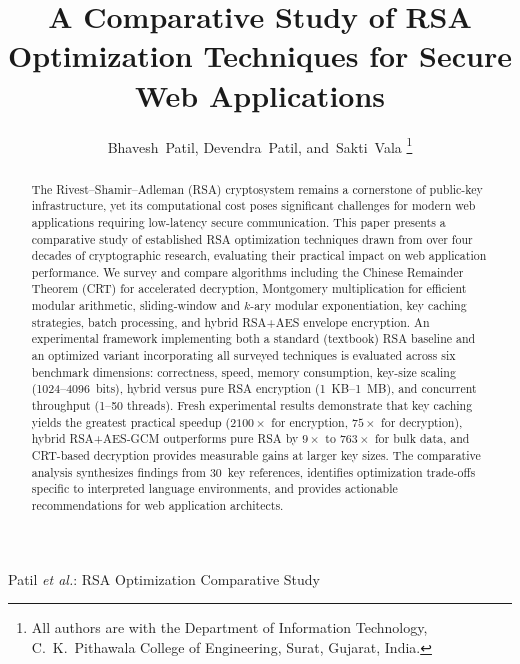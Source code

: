 \documentclass[journal]{IEEEtran}
\begin{document}
\title{A Comparative Study of RSA Optimization Techniques for Secure Web Applications}

\author{
Bhavesh~Patil,
Devendra~Patil,
and~Sakti~Vala%
\thanks{All authors are with the Department of Information Technology,
C.~K.~Pithawala College of Engineering, Surat, Gujarat, India.}%
}

%
{Patil \MakeLowercase{\textit{et al.}}: RSA Optimization Comparative Study}


\maketitle

\begin{abstract}
The Rivest--Shamir--Adleman (RSA) cryptosystem remains a cornerstone of public-key infrastructure, yet its computational cost poses significant challenges for modern web applications requiring low-latency secure communication. This paper presents a comparative study of established RSA optimization techniques drawn from over four decades of cryptographic research, evaluating their practical impact on web application performance. We survey and compare algorithms including the Chinese Remainder Theorem (CRT) for accelerated decryption, Montgomery multiplication for efficient modular arithmetic, sliding-window and $k$-ary modular exponentiation, key caching strategies, batch processing, and hybrid RSA+AES envelope encryption. An experimental framework implementing both a standard (textbook) RSA baseline and an optimized variant incorporating all surveyed techniques is evaluated across six benchmark dimensions: correctness, speed, memory consumption, key-size scaling (1024--4096~bits), hybrid versus pure RSA encryption (1~KB--1~MB), and concurrent throughput (1--50 threads). Fresh experimental results demonstrate that key caching yields the greatest practical speedup ($2100\times$ for encryption, $75\times$ for decryption), hybrid RSA+AES-GCM outperforms pure RSA by $9\times$ to $763\times$ for bulk data, and CRT-based decryption provides measurable gains at larger key sizes. The comparative analysis synthesizes findings from 30~key references, identifies optimization trade-offs specific to interpreted language environments, and provides actionable recommendations for web application architects.
\end{abstract}
\end{document}
